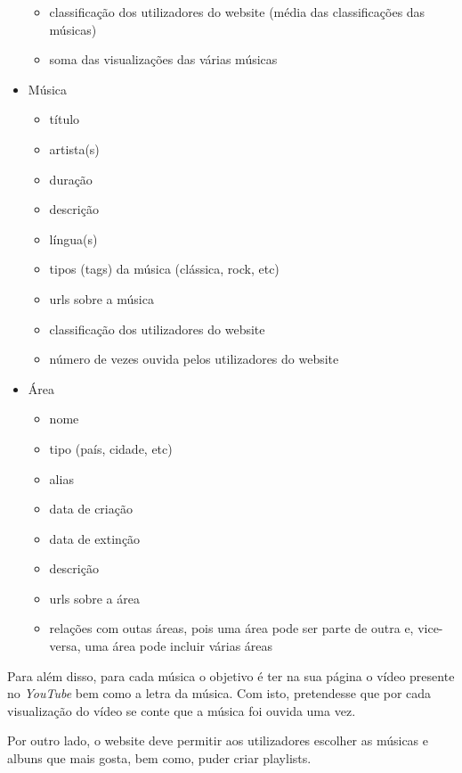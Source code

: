 \documentclass{article}
\begin{document}
\begin{itemize}
\begin{itemize}
            \item classificação dos utilizadores do website (média das classificações das músicas)
            \item soma das visualizações das várias músicas
        \end{itemize}
    \item Música
        \begin{itemize}
            \item título
            \item artista(s)
            \item duração
            \item descrição
            \item língua(s)
            \item tipos (tags) da música (clássica, rock, etc)
            \item urls sobre a música
            \item classificação dos utilizadores do website
            \item número de vezes ouvida pelos utilizadores do website
        \end{itemize}
    \item Área
        \begin{itemize}
            \item nome
            \item tipo (país, cidade, etc)
            \item alias
            \item data de criação
            \item data de extinção
            \item descrição
            \item urls sobre a área
            \item relações com outas áreas, pois uma área pode ser parte de outra e, vice-versa, uma área pode incluir várias áreas
        \end{itemize}
\end{itemize}

Para além disso, para cada música o objetivo é ter na sua página o vídeo presente no \textit{YouTube} bem como a letra da música. Com isto, pretendesse que por cada visualização do vídeo se conte que a música foi ouvida uma vez.

Por outro lado, o website deve permitir aos utilizadores escolher as músicas e albuns que mais gosta, bem como, puder criar playlists.
\end{document}
